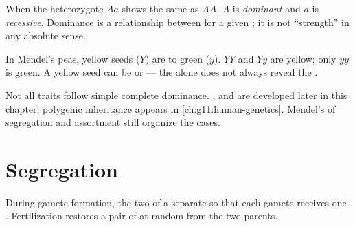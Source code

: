 \begin{definition}[Dominance]\label{def:g11:mendelian-genetics:dominance}
When the heterozygote $Aa$ shows the same  as $AA$,  $A$ is
\emph{dominant} and $a$ is \emph{recessive}. Dominance is a relationship between  for a given ; it
is not ``strength'' in any absolute sense.
\end{definition}

\begin{example}\label{ex:g11:mendelian-genetics:peas}
In Mendel's peas, yellow seeds ($Y$) are  to green ($y$). 
$YY$ and $Yy$ are yellow; only $yy$ is green. A yellow seed can be  or
 --- the  alone does not always reveal the .
\end{example}

\begin{remark}
Not all traits follow simple complete dominance. ,
 and  are developed later in this chapter;
polygenic inheritance appears in \cref{ch:g11:human-genetics}. Mendel's
 of segregation and assortment still organize the  cases.
\end{remark}

\section{Segregation}

\begin{proposition}\label{prop:g11:mendelian-genetics:segregation}
During gamete formation, the two  of a  separate so that each gamete
receives one . Fertilization restores a pair of  at random from the
two parents.
\end{proposition}
\admitted

